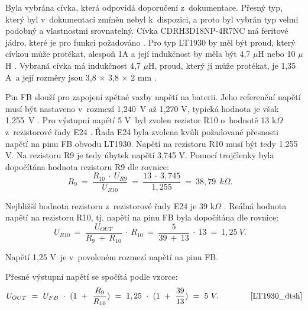 Byla vybrána cívka, která odpovídá doporučení z~dokumentace. Přesný typ, který byl v~dokumentaci zmíněn nebyl k~dispozici, a proto byl vybrán typ velmi podobný a vlastnostmi 
srovnatelný. Cívka CDRH3D18NP-4R7NC má feritové jádro, které je pro funkci požadováno \cite{LT1930_dtsh}. Pro typ LT1930 by měl být proud, který cívkou může protékat, alespoň
1A a její indukčnost by měla být 4,7 $\mu$H nebo 10 $\mu$H \cite{LT1930_dtsh}. Vybraná cívka má indukčnost 4,7 $\mu$H, proud, který jí může protékat, je 1,35 A~a její rozměry 
jsou 3,8 $\times$ 3,8 $\times$ 2 mm \cite{civka_dtsh}.

Pin FB slouží  pro zapojení zpětné vazby napětí na baterii. Jeho referenční napětí musí být nastaveno v~rozmezí 1,240~V až 1,270 V, typická hodnota je však 1,255~V \cite{LT1930_dtsh}. 
Pro výstupní napětí 5 V~byl zvolen rezistor R10 o~hodnotě 13 k$\Omega$ z~rezistorové řady E24 \cite{rezistorova_rada}. Řada E24 byla zvolena kvůli požadované přesnosti
napětí na pinu FB obvodu LT1930. Napětí na rezistoru R10 musí být tedy 1.255 V. Na rezistoru R9 je tedy úbytek napětí 3,745 V. Pomocí trojčlenky byla dopočítána hodnota 
rezistoru R9 dle rovnice:
\begin{equation} 
  R_{9}~=~\frac{R_{10}~\cdot~U_{R9}}{U_{R10}}~=~\frac{13~\cdot~3,745}{1,255}~=~38,79~\:k\Omega. 
  \quad
\label{eq:R9}
\end{equation}

Nejbližší hodnota rezistoru z~rezistorové řady E24 je 39 k$\Omega$ \cite{rezistorova_rada}. Reálná hodnota napětí na rezistoru R10, tj. napětí na pinu FB byla dopočítána
dle rovnice:
\begin{equation} 
  U_{R10}~=~\frac{U_{OUT}}{R_{9}~+~R_{10}}~\cdot~R_{10}~=~\frac{5}{39~+~13}~\cdot~13~=~1,25~V. 
  \quad
\label{eq:UR10}
\end{equation}

Napětí 1,25 V~je v~povoleném rozmezí napětí na pinu FB. 

Přesné výstupní napětí se spočítá podle vzorce:
\begin{equation} 
  U_{OUT}~=~U_{FB}~\cdot~(1~+~\frac{R_{9}}{R_{10}})~=~1,25~\cdot~(1~+~\frac{39}{13})~=~5~V. 
  \quad \quad \quad \quad \cite{LT1930_dtsh}
\label{eq:VOUT_LT1930}
\end{equation}

